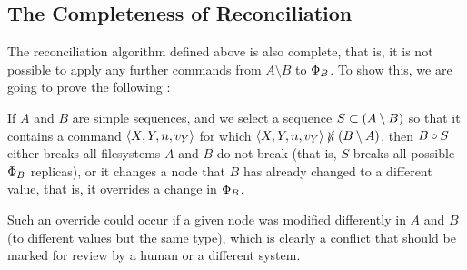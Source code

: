 
\subsection{The Completeness of Reconciliation}


The reconciliation algorithm defined above is also complete, that is,
it is not possible to apply any further commands from $A\setminus B$ to $\Phi_B$.
To show this, we are going to prove the following :

\begin{myth}\label{rec_is_complete}
If $A$ and $B$ are simple sequences,
and we select a sequence $S\subset (A\setminus B)$ so that
it contains a command $\langle{X,Y,n,v_Y}\rangle$ for which $\cxynv\nindep\bma$,
then $B\circ S$ either breaks all filesystems $A$ and $B$ do not break
(that is, $S$ breaks all possible $\Phi_B$ replicas),
or it changes a node that $B$ has already changed to a different value,
that is, it overrides a change in $\Phi_B$.
\end{myth}
Such an override could occur if a given node was modified differently in
$A$ and $B$ (to different values but the same type), which is clearly
a conflict that should be marked for review
by a human or a different system.
